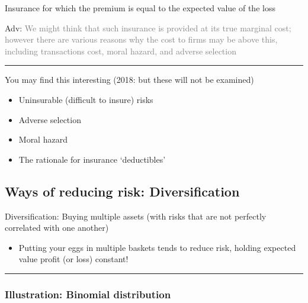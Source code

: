 \documentclass[]{article}
\providecommand{\tightlist}{%
  \setlength{\itemsep}{0pt}\setlength{\parskip}{0pt}}
\begin{document}
\begin{description}
\tightlist
\item[Fair insurance]
Insurance for which the premium is equal to the expected value of the
loss
\end{description}

\textcolor{RawSienna}{Adv:}
\textcolor{gray}{We might think that such insurance is provided at its true marginal cost; however there are various reasons why the cost to firms may be above this, including transactions cost, moral hazard, and adverse selection}

\begin{center}\rule{0.5\linewidth}{\linethickness}\end{center}

You may find this interesting (2018: but these will not be examined)

\begin{itemize}
\tightlist
\item
  Uninsurable (difficult to insure) risks
\item
  Adverse selection
\item
  Moral hazard
\item
  The rationale for insurance `deductibles'
\end{itemize}

\hypertarget{ways-of-reducing-risk-diversification}{%
\subsection{Ways of reducing risk:
Diversification}\label{ways-of-reducing-risk-diversification}}

Diversification: Buying multiple assets (with risks that are not
perfectly correlated with one another)

\begin{itemize}
\tightlist
\item
  Putting your eggs in multiple baskets tends to reduce risk, holding
  expected value profit (or loss) constant!
\end{itemize}

\begin{center}\rule{0.5\linewidth}{\linethickness}\end{center}

\hypertarget{illustration-binomial-distribution}{%
\subsubsection{Illustration: Binomial
distribution}\label{illustration-binomial-distribution}}
\end{document}
